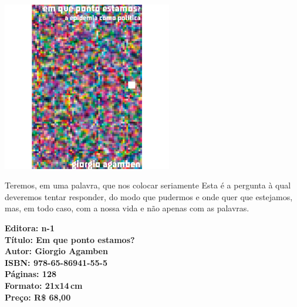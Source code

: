 \begin{center}
\hspace*{-3.6cm}
\hspace*{3.1cm}\includegraphics[width=74mm]{./CAPAS/N-1_AGAMBEN.jpg}
\end{center}

\hspace*{-7cm}\hrulefill\hspace*{-7cm}

\medskip

\noindent{}Teremos, em uma palavra, que nos colocar seriamente  Esta é a pergunta à qual deveremos tentar responder, do modo que pudermos e onde quer que estejamos, mas, em todo caso, com a nossa vida e não apenas com as palavras.

\vfill

\hspace*{-.4cm}\begin{minipage}[c]{1\linewidth}
\small\textbf{
\hspace*{-.1cm}Editora: n-1\\
Título: Em que ponto estamos?\\
Autor: Giorgio Agamben\\
ISBN: 978-65-86941-55-5\\
Páginas: 128\\
Formato: 21x14\,cm\\
Preço: R\$ 68,00\\
}
\end{minipage}

\pagebreak


